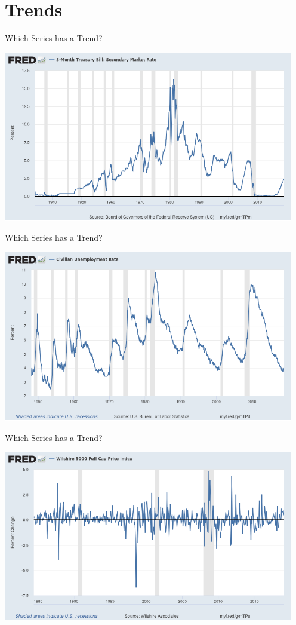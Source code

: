 \section{Trends}

\begin{frame}{Which Series has a Trend?}
\begin{center}
\includegraphics[width=5in]{./resources/treasury_90.png}
\end{center}
\end{frame}

\begin{frame}{Which Series has a Trend?}
\begin{center}
\includegraphics[width=5in]{./resources/unemployment.png}
\end{center}
\end{frame}

\begin{frame}{Which Series has a Trend?}
\begin{center}
\includegraphics[width=5in]{./resources/wilshire_5000.png}
\end{center}
\end{frame}

